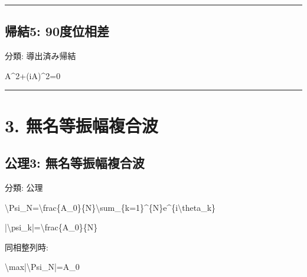 \documentclass[
  a4paper]{ltjsarticle}
\newenvironment{Shaded}{}{}
\newcommand{\NormalTok}[1]{#1}
\begin{document}
\begin{center}\rule{0.5\linewidth}{0.5pt}\end{center}

\subsection{帰結5:
90度位相差}\label{ux5e30ux7d505-90ux5ea6ux4f4dux76f8ux5dee}

分類: 導出済み帰結

\begin{Shaded}
\begin{Highlighting}[]
\NormalTok{A\^{}2+(iA)\^{}2=0}
\end{Highlighting}
\end{Shaded}

\begin{center}\rule{0.5\linewidth}{0.5pt}\end{center}

\section{3.
無名等振幅複合波}\label{ux7121ux540dux7b49ux632fux5e45ux8907ux5408ux6ce2}

\subsection{公理3:
無名等振幅複合波}\label{ux516cux74063-ux7121ux540dux7b49ux632fux5e45ux8907ux5408ux6ce2}

分類: 公理

\begin{Shaded}
\begin{Highlighting}[]
\NormalTok{\textbackslash{}Psi\_N=\textbackslash{}frac\{A\_0\}\{N\}\textbackslash{}sum\_\{k=1\}\^{}\{N\}e\^{}\{i\textbackslash{}theta\_k\}}
\end{Highlighting}
\end{Shaded}

\begin{Shaded}
\begin{Highlighting}[]
\NormalTok{|\textbackslash{}psi\_k|=\textbackslash{}frac\{A\_0\}\{N\}}
\end{Highlighting}
\end{Shaded}

同相整列時:

\begin{Shaded}
\begin{Highlighting}[]
\NormalTok{\textbackslash{}max|\textbackslash{}Psi\_N|=A\_0}
\end{Highlighting}
\end{Shaded}
\end{document}
